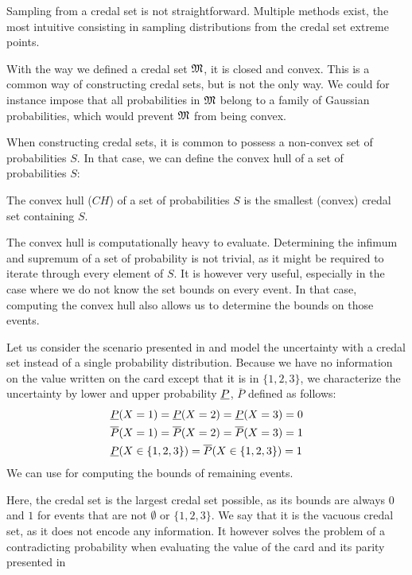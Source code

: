 \begin{remark}
    Sampling from a credal set is not straightforward. Multiple methods exist, the most intuitive consisting in sampling distributions from the credal set extreme points.
\end{remark}

\begin{remark}
    With the way we defined a credal set $\mathfrak{M}$, it is closed and convex. This is a common way of constructing credal sets, but is not the only way. We could for instance impose that all probabilities in $\mathfrak{M}$ belong to a family of Gaussian probabilities, which would prevent $\mathfrak{M}$ from being convex.
\end{remark}

When constructing credal sets, it is common to possess a non-convex set of probabilities $S$. In that case, we can define the convex hull of a set of probabilities $S$:
\begin{definition}\label{def:convex_hull}
    The convex hull ($CH$) of a set of probabilities $S$ is the smallest (convex) credal set containing $S$.
\end{definition}

\begin{remark}
    The convex hull is computationally heavy to evaluate. Determining the infimum and supremum of a set of probability is not trivial, as it might be required to iterate through every element of $S$. It is however very useful, especially in the case where we do not know the set bounds on every event. In that case, computing the convex hull also allows us to determine the bounds on those events.
\end{remark}

\begin{example}
    Let us consider the scenario presented in  and model the uncertainty with a credal set instead of a single probability distribution. Because we have no information on the value written on the card except that it is in $\{1,2,3\}$, we characterize the uncertainty by lower and upper probability $\underline{P}$, $\overline{P}$ defined as follows:
    \begin{align*}
        &\underline{P}(X=1) = \underline{P}(X=2)= \underline{P}(X=3) = 0\\
        &\overline{P}(X=1) = \overline{P}(X=2)= \overline{P}(X=3) = 1\\
        &\underline{P}(X\in\{1,2,3\}) = \overline{P}(X\in\{1,2,3\}) = 1
    \end{align*}
    We can use  for computing the bounds of remaining events.
    
    Here, the credal set is the largest credal set possible, as its bounds are always $0$ and $1$ for events that are not $\emptyset$ or $\{1,2,3\}$. We say that it is the vacuous credal set, as it does not encode any information. It however solves the problem of a contradicting probability when evaluating the value of the card and its parity presented in 
\end{example}

